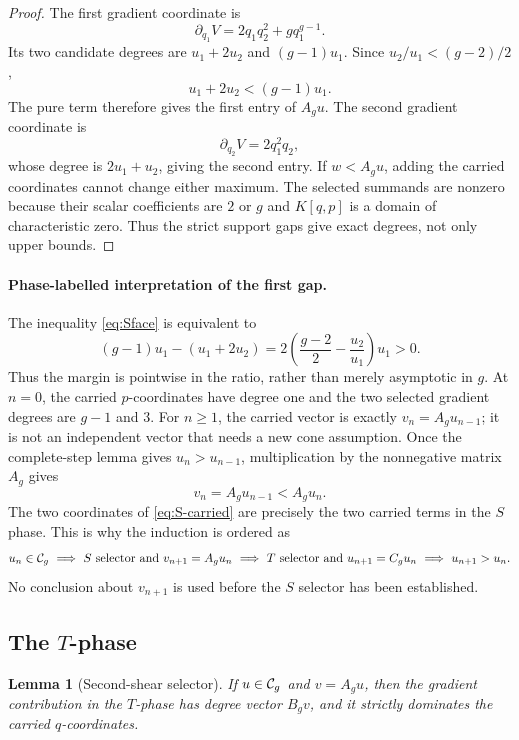 \documentclass[11pt]{article}
\newtheorem{lemma}[theorem]{Lemma}
\theoremstyle{remark}
\numberwithin{equation}{section}
\begin{document}
\begin{proof}
The first gradient coordinate is
\[
 \partial_{q_1}V=2q_1q_2^2+gq_1^{g-1}.
\]
Its two candidate degrees are $u_1+2u_2$ and $(g-1)u_1$.  Since
$u_2/u_1<(g-2)/2$,
\begin{equation}\label{eq:Sface}
 u_1+2u_2<(g-1)u_1.
\end{equation}
The pure term therefore gives the first entry of $A_gu$.  The second gradient
coordinate is
\[
 \partial_{q_2}V=2q_1^2q_2,
\]
whose degree is $2u_1+u_2$, giving the second entry.  If
$w<A_gu$, adding the carried coordinates cannot change either maximum.
The selected summands are nonzero because their scalar coefficients are $2$
or $g$ and $K[q,p]$ is a domain of characteristic zero.  Thus the strict
support gaps give exact degrees, not only upper bounds.
\end{proof}

\paragraph{Phase-labelled interpretation of the first gap.}
The inequality \eqref{eq:Sface} is equivalent to
\[
 (g-1)u_1-(u_1+2u_2)
 =2\left(\frac{g-2}{2}-\frac{u_2}{u_1}\right)u_1>0.
\tag{S-gap}\label{eq:S-gap-margin}
\]
Thus the margin is pointwise in the ratio, rather than merely asymptotic in
$g$.  At $n=0$, the carried $p$-coordinates have degree one and the two
selected gradient degrees are $g-1$ and $3$.  For $n\geq1$, the carried vector
is exactly $v_n=A_gu_{n-1}$; it is not an independent vector that needs a new
cone assumption.  Once the complete-step lemma gives
$u_n>u_{n-1}$, multiplication by the nonnegative matrix $A_g$ gives
\[
 v_n=A_gu_{n-1}<A_gu_n.
\tag{S-carried}\label{eq:S-carried}
\]
The two coordinates of \eqref{eq:S-carried} are precisely the two carried
terms in the $S$ phase.  This is why the induction is ordered as
\[
 u_n\in\mathcal{C}_g
\ \Longrightarrow\
 \text{$S$ selector and }v_{n+1}=A_gu_n
\ \Longrightarrow\
 \text{$T$ selector and }u_{n+1}=C_gu_n
\ \Longrightarrow\
 u_{n+1}>u_n.
\]
No conclusion about $v_{n+1}$ is used before the $S$ selector has been
established.

\subsection{The \(T\)-phase}

\begin{lemma}[Second-shear selector]\label{lem:Tselector}
If \(u\in\mathcal{C}_g\) and \(v=A_gu\), then the gradient contribution in the
\(T\)-phase has degree vector \(B_gv\), and it strictly dominates the carried
\(q\)-coordinates.
\end{lemma}
\end{document}
